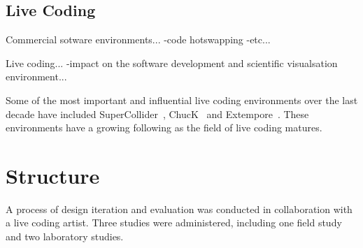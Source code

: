 


\subsection{Live Coding}

Commercial sotware environments...
-code hotswapping
-etc...

Live coding...
-impact on the software development and scientific visualsation environment...

Some of the most important and influential live coding environments over the last decade have included SuperCollider~\cite{McCartney}, ChucK~\cite{Wang2008} and Extempore~\cite{Sorensen}. These environments have a growing following as the field of live coding matures.




\section{Structure}

A process of design iteration and evaluation was conducted in collaboration with a live coding artist. Three studies were administered, including one field study and two laboratory studies.

